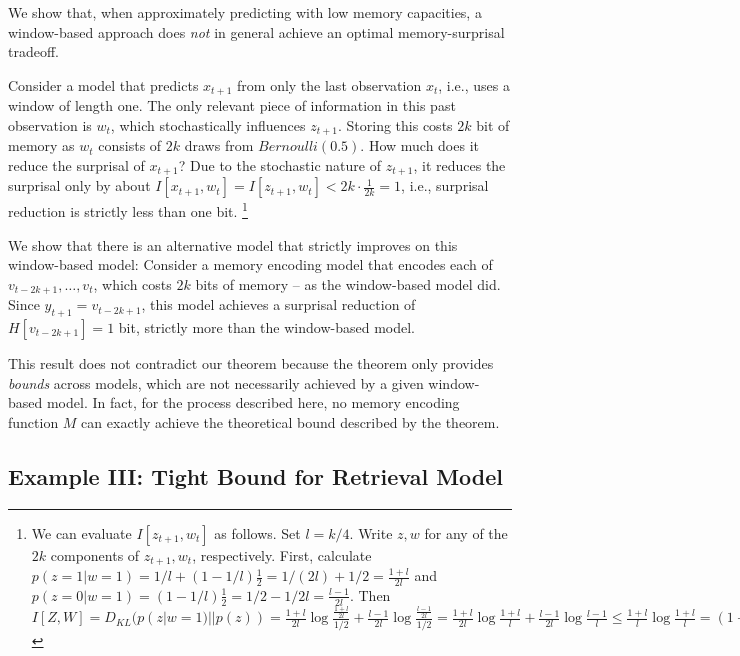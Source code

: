 \documentclass[11pt,letterpaper]{article}
\newcounter{theorem}
\begin{document}
We show that, when approximately predicting with low memory capacities, a window-based approach does \emph{not} in general achieve an optimal memory-surprisal tradeoff.

Consider a model that predicts $x_{t+1}$ from only the last observation $x_t$, i.e., uses a window of length one.
The only relevant piece of information in this past observation is $w_t$, which stochastically influences $z_{t+1}$.
Storing this costs $2k$ bit of memory as $w_t$ consists of $2k$ draws from $Bernoulli(0.5)$.
How much does it reduce the surprisal of $x_{t+1}$?
Due to the stochastic nature of $z_{t+1}$, it reduces the surprisal only by about $I[x_{t+1}, w_t] = I[z_{t+1}, w_t] < 2k \cdot \frac{1}{2k} = 1$, i.e., surprisal reduction is strictly less than one bit.
\footnote{We can evaluate $I[z_{t+1}, w_t]$ as follows. Set $l = k/4$. Write $z, w$ for any of the $2k$ components of $z_{t+1}, w_t$, respectively. First, calculate $p(z = 1|w=1) = 1/l + (1-1/l) \frac{1}{2} = 1/(2l) + 1/2 = \frac{1+l}{2l}$ and $p(z = 0|w=1) = (1-1/l) \frac{1}{2} = 1/2 - 1/2l = \frac{l-1}{2l}$.
Then $I[Z, W] = D_{KL}(p(z|w=1)||p(z)) = \frac{1+l}{2l} \log \frac{\frac{1+l}{2l}}{1/2} + \frac{l-1}{2l} \log \frac{\frac{l-1}{2l}}{1/2}  = \frac{1+l}{2l} \log \frac{1+l}{l} + \frac{l-1}{2l} \log \frac{l-1}{l}  \leq \frac{1+l}{l} \log \frac{1+l}{l} =  (1+1/l) \log (1+1/l)  \leq  (1+1/l) (1/l) = 1/l + 1/l^2 < 2/l = \frac{1}{2k}.$
}

We show that there is an alternative model that strictly improves on this window-based model:
Consider a memory encoding model that encodes each of $v_{t-2k+1}, \dots, v_{t}$, which costs $2k$ bits of memory -- as the window-based model did.
Since $y_{t+1} = v_{t-2k+1}$, this model achieves a surprisal reduction of $H[v_{t-2k+1}] = 1$ bit, strictly more than the window-based model.


This result does not contradict our theorem because the theorem only provides \emph{bounds} across models, which are not necessarily achieved by a given window-based model.
In fact, for the process described here, no memory encoding function $M$ can exactly achieve the theoretical bound described by the theorem.

\subsection{Example III: Tight Bound for Retrieval Model}
\end{document}
